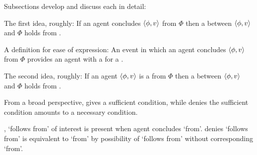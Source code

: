 \begin{note}
  Subsections develop and discuss each in detail:

  \begin{TOCEnum}
  \item

    The first idea, roughly:
    If an agent concludes \(\langle \phi, v \rangle\) from \(\Phi\) then a \ros{} between \(\langle \phi, v \rangle\) and \(\Phi\) holds from .
  \item

    A definition for ease of expression:
    An event in which an agent concludes \(\langle \phi, v \rangle\) from \(\Phi\) provides an agent with a  for a \ros{}.
  \item

    The second idea, roughly:
    If an agent \(\langle \phi, v \rangle\) is a \fc{} from \(\Phi\) then a \ros{} between \(\langle \phi, v \rangle\) and \(\Phi\) holds from .
  \end{TOCEnum}
\end{note}

\begin{note}
  From a broad perspective, \supportI{} gives a sufficient condition, while \supportII{} denies the sufficient condition amounts to a necessary condition.

  \supportI{}, `follows from' of interest is present when agent concludes `from'.
  \supportII{} denies `follows from' is equivalent to `from' by possibility of `follows from' without corresponding `from'.
\end{note}

\section{\supportI{}}
\label{cha:ros:I}

